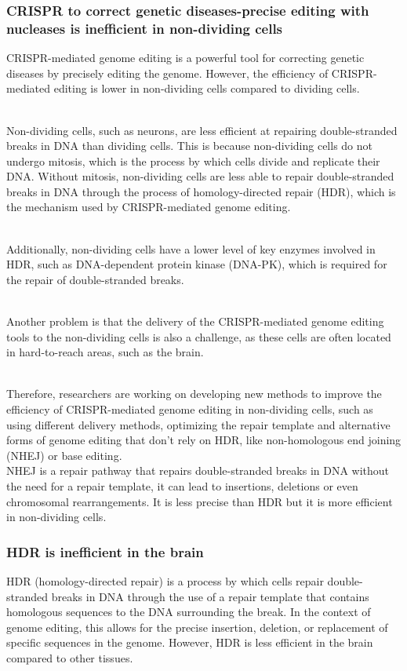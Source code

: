 \begin{itemize}
\begin{itemize}
\subsubsection{CRISPR to correct genetic diseases-precise editing with nucleases is inefficient in non-dividing cells}
CRISPR-mediated genome editing is a powerful tool for correcting genetic diseases by precisely editing the genome. However, the efficiency of CRISPR-mediated editing is lower in non-dividing cells compared to dividing cells.

\\Non-dividing cells, such as neurons, are less efficient at repairing double-stranded breaks in DNA than dividing cells. This is because non-dividing cells do not undergo mitosis, which is the process by which cells divide and replicate their DNA. Without mitosis, non-dividing cells are less able to repair double-stranded breaks in DNA through the process of homology-directed repair (HDR), which is the mechanism used by CRISPR-mediated genome editing.

\\Additionally, non-dividing cells have a lower level of key enzymes involved in HDR, such as DNA-dependent protein kinase (DNA-PK), which is required for the repair of double-stranded breaks.

\\Another problem is that the delivery of the CRISPR-mediated genome editing tools to the non-dividing cells is also a challenge, as these cells are often located in hard-to-reach areas, such as the brain.

\\Therefore, researchers are working on developing new methods to improve the efficiency of CRISPR-mediated genome editing in non-dividing cells, such as using different delivery methods, optimizing the repair template and alternative forms of genome editing that don't rely on HDR, like non-homologous end joining (NHEJ) or base editing.
\\NHEJ is a repair pathway that repairs double-stranded breaks in DNA without the need for a repair template, it can lead to insertions, deletions or even chromosomal rearrangements. It is less precise than HDR but it is more efficient in non-dividing cells.
\subsubsection{HDR is inefficient in the brain}
HDR (homology-directed repair) is a process by which cells repair double-stranded breaks in DNA through the use of a repair template that contains homologous sequences to the DNA surrounding the break. In the context of genome editing, this allows for the precise insertion, deletion, or replacement of specific sequences in the genome. However, HDR is less efficient in the brain compared to other tissues.


\end{itemize}
\end{itemize}
